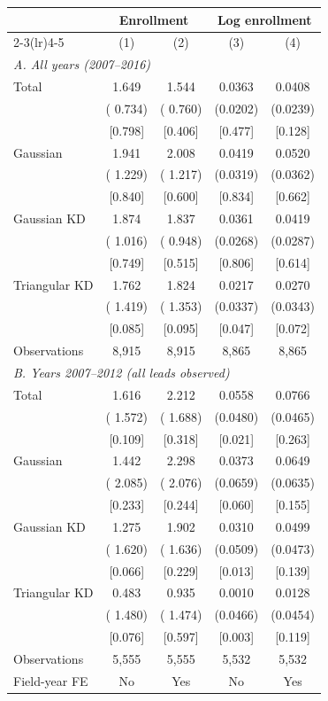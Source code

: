 \begin{tabular}{lcccc}
\toprule
 & \multicolumn{2}{c}{Enrollment} & \multicolumn{2}{c}{Log enrollment} \\
\cmidrule(lr){2-3}\cmidrule(lr){4-5}
 & (1) & (2) & (3) & (4) \\
\midrule
\multicolumn{5}{l}{\textit{A. All years (2007--2016)}} \\
Total &  1.649\sym{**} &  1.544\sym{**} & 0.0363\sym{*} & 0.0408\sym{*} \\
 & ( 0.734) & ( 0.760) & (0.0202) & (0.0239) \\
 & [0.798] & [0.406] & [0.477] & [0.128] \\
Gaussian &  1.941 &  2.008 & 0.0419 & 0.0520 \\
 & ( 1.229) & ( 1.217) & (0.0319) & (0.0362) \\
 & [0.840] & [0.600] & [0.834] & [0.662] \\
Gaussian KD &  1.874\sym{*} &  1.837\sym{*} & 0.0361 & 0.0419 \\
 & ( 1.016) & ( 0.948) & (0.0268) & (0.0287) \\
 & [0.749] & [0.515] & [0.806] & [0.614] \\
Triangular KD &  1.762 &  1.824 & 0.0217 & 0.0270 \\
 & ( 1.419) & ( 1.353) & (0.0337) & (0.0343) \\
 & [0.085] & [0.095] & [0.047] & [0.072] \\
Observations &     8,915 &     8,915 &     8,865 &     8,865 \\
\midrule
\multicolumn{5}{l}{\textit{B. Years 2007--2012 (all leads observed)}} \\
Total &  1.616 &  2.212 & 0.0558 & 0.0766 \\
 & ( 1.572) & ( 1.688) & (0.0480) & (0.0465) \\
 & [0.109] & [0.318] & [0.021] & [0.263] \\
Gaussian &  1.442 &  2.298 & 0.0373 & 0.0649 \\
 & ( 2.085) & ( 2.076) & (0.0659) & (0.0635) \\
 & [0.233] & [0.244] & [0.060] & [0.155] \\
Gaussian KD &  1.275 &  1.902 & 0.0310 & 0.0499 \\
 & ( 1.620) & ( 1.636) & (0.0509) & (0.0473) \\
 & [0.066] & [0.229] & [0.013] & [0.139] \\
Triangular KD &  0.483 &  0.935 & 0.0010 & 0.0128 \\
 & ( 1.480) & ( 1.474) & (0.0466) & (0.0454) \\
 & [0.076] & [0.597] & [0.003] & [0.119] \\
Observations &     5,555 &     5,555 &     5,532 &     5,532 \\
\midrule
Field-year FE & No & Yes & No & Yes \\
\bottomrule
\end{tabular}
